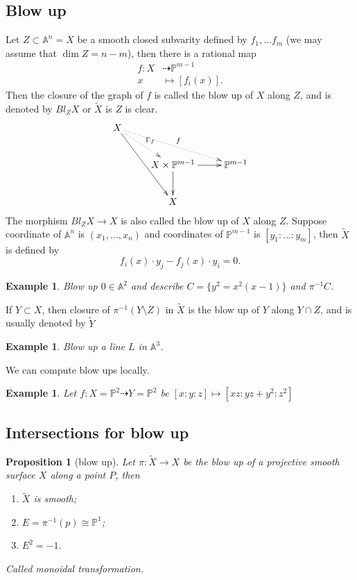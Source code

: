 \documentclass{article}
\newtheorem{prop}[defn]{Proposition}
\newtheorem{exa}[defn]{Example}
\begin{document}
\subsection{Blow up}
Let $Z \subset \mathbb{A}^{n}=X$ be a smooth closed subvarity defined by $f_{1},\ldots f_{m}$ (we may assume that $\dim Z = n-m$), then there is a rational map
\begin{align*}
	f: X & \dashrightarrow \mathbb{P}^{m-1} \\
	x    & \mapsto [f_{i}(x)]
	.\end{align*}
Then the closure of the graph of $f$ is called the blow up of $X$ along $Z$, and is denoted by $Bl_{Z}X$ or $ \widetilde{X}$ is $Z$ is clear.
\[
	\xymatrix{
		X\ar@{..>}[rrd]^{f}\ar[rdd]\ar@{..>}[rd]^{\Gamma_f} & & \\
		&X\times \mathbb{P}^{m-1}\ar[d]\ar[r] & \mathbb{P}^{m-1} \\
		&X &
	}
\]
The morphism $Bl_{Z}X\to X$ is also called the blow up of $X$ along $Z$. Suppose coordinate of $\mathbb{A}^{n}$ is $(x_{1},\ldots ,x_{n})$ and coordinates of $\mathbb{P}^{m-1}$ is $[y_{1}:\ldots :y_{m}]$, then $ \widetilde{X}$ is defined by
\[
	f_{i}(x)\cdot y_{j} - f_{j}(x)\cdot y_{i}=0.
\]

\begin{exa}
	Blow up  $0\in \mathbb{A}^{2}$ and describe $C=\{y^{2}=x^{2}(x-1)\} $ and $\pi^{-1}C$.
\end{exa}
If $Y \subset X$, then closure of $\pi^{-1}(Y\setminus Z)$ in $ \widetilde{X}$ is the blow up of $Y$ along $Y \cap Z$, and is usually denoted by $ \widetilde{Y}$

\begin{exa}
	Blow up a line $L$ in $\mathbb{A}^{3}$.
\end{exa}
We can compute blow ups locally.
\begin{exa}
	Let $f: X=\mathbb{P}^{2} \dashrightarrow Y=\mathbb{P}^{2}$ be $[x:y:z]\mapsto [xz:yz+y^2:z^2]$
\end{exa}

\subsection{Intersections for blow up}
\begin{prop}[blow up]
	Let $\pi: \widetilde{X} \to X$ be the blow up of a projective smooth surface $X$ along a point $P$, then
	\begin{enumerate}
		\item $\widetilde{X}$ is smooth;
		\item $E=\pi^{-1}(p)\cong \mathbb{P}^{1}$;
		\item $E^{2}=-1$.
	\end{enumerate}
	Called monoidal transformation.
\end{prop}
\end{document}
